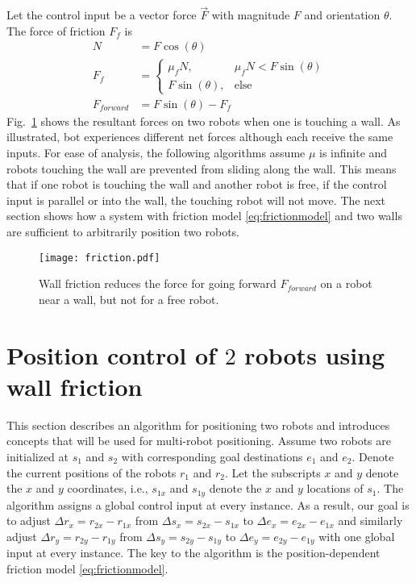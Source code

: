  Let the control input be a vector force $\vec{F}$ with magnitude $F$ and orientation $\theta$.  The force of friction $F_f$ is
\begin{align}
N &= F \cos(\theta) \nonumber\\
F_f &= \begin{cases}  \mu_f N, &  \mu_f N < F \sin(\theta)  \label{eq:frictionmodel} \\ 
F \sin(\theta), & \text{else} \end{cases}  \\%
F_{forward} &=  F \sin(\theta) - F_f  \nonumber
\end{align}
 Fig.~\ref{fig:friction} shows the resultant forces on two robots when one is touching a wall. As illustrated, bot experiences different net forces although each receive the same inputs.
  For ease of analysis, the following algorithms assume $\mu$ is infinite and robots touching the wall are prevented from sliding along the wall.
This means that if one robot is touching the wall and another robot is free, if the control input is parallel or into the wall, the touching robot will not move. 
The next section shows how a system with friction model \eqref{eq:frictionmodel} and two walls are sufficient to arbitrarily position two robots. 
\begin{figure}[h]
\begin{center}
\texttt{[image: friction.pdf]} 
\caption{Wall friction reduces the force for going forward $F_{forward}$ on a robot near a wall, but not for a free robot.}
\label{fig:friction}
\end{center}
\end{figure} 




\section{Position control of $2$ robots using wall friction}\label{sec:PostionControl2Robots}
This section describes an algorithm for positioning two robots and introduces concepts that will be used for multi-robot positioning.
Assume two robots are initialized at $s_1$ and $s_2$ with corresponding goal destinations $e_1$ and $e_2$. 
Denote the current positions of the robots  $r_1$ and $r_2$. 
Let the subscripts $x$ and $y$ denote the $x$ and $y$ coordinates, i.e., $s_{1x}$ and $s_{1y}$ denote the $x$ and $y$ locations of $s_1$. 
The algorithm assigns a global control input at every instance.
 As a result, our goal is to adjust 
 $\Delta r_x = r_{2x}-r_{1x}$ from $\Delta s_x = s_{2x}-s_{1x}$ to $\Delta e_x = e_{2x}-e_{1x}$ and similarly adjust 
 $\Delta r_y = r_{2y}-r_{1y}$ from $\Delta s_y = s_{2y}-s_{1y}$ to $\Delta e_y = e_{2y}-e_{1y}$ with one global input at every instance. 
 The key to the algorithm is the position-dependent friction model \eqref{eq:frictionmodel}.

